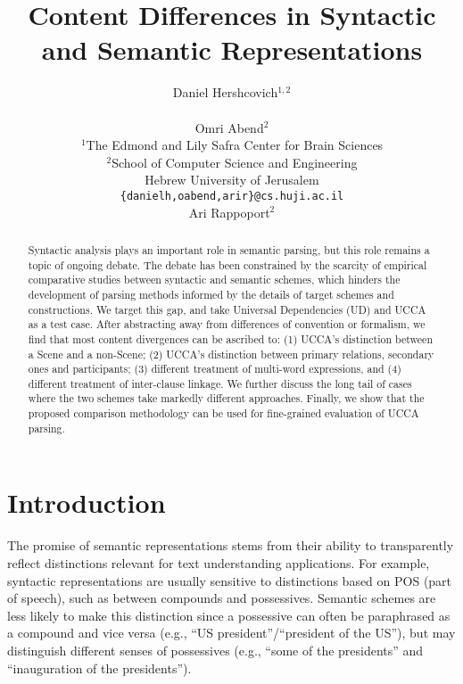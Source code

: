 \documentclass[11pt,a4paper]{article}
\title{Content Differences in Syntactic and Semantic Representations}
\author{Daniel Hershcovich$^{1,2}$ \\
  \\\And
  Omri Abend$^2$ \\
  $^1$The Edmond and Lily Safra Center for Brain Sciences \\
  $^2$School of Computer Science and Engineering \\
  Hebrew University of Jerusalem \\
  \texttt{\{danielh,oabend,arir\}@cs.huji.ac.il}
  \\\And
  Ari Rappoport$^2$
}
\date{}
\begin{document}
\maketitle

\begin{abstract}

  Syntactic analysis plays an important role in semantic parsing,
  but this role remains a topic of ongoing debate.
  The debate has been constrained by the scarcity of empirical comparative studies between syntactic and semantic schemes,
  which hinders the development of parsing methods informed by the details of target schemes and constructions.
  We target this gap, and take Universal Dependencies (UD) and UCCA as a test case.
  After abstracting away from differences of convention or formalism,
  we find that most content divergences can be ascribed to: 
  (1) UCCA's distinction between a Scene and a non-Scene; %
  (2) UCCA's distinction between primary relations, secondary ones and participants; %
  (3) different treatment of multi-word expressions, and
  (4) different treatment of inter-clause linkage.
  We further discuss the long tail of cases where the two schemes take markedly
  different approaches.
  Finally, we show that the proposed comparison methodology can be used
  for fine-grained evaluation of UCCA parsing.
\end{abstract}


\section{Introduction}\label{sec:introduction}
  
  The promise of semantic representations stems from 
  their ability to transparently reflect distinctions relevant for text understanding
  applications. For example, syntactic representations
  are usually sensitive to distinctions based on POS (part of speech), such as between compounds
  and possessives. Semantic schemes are  less likely to make
  this distinction since a possessive can often be paraphrased as a compound
  and vice versa (e.g., ``US president''/``president of the US''),
  but may distinguish different senses of possessives (e.g., ``some of the presidents'' and ``inauguration of the presidents'').
\end{document}
